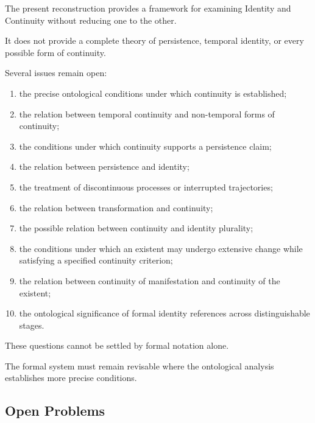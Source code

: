 The present reconstruction
provides a framework
for examining Identity
and Continuity without
reducing one to the
other.

It does not provide
a complete theory
of persistence, temporal
identity, or every
possible form of
continuity.

Several issues remain
open:

\begin{enumerate}
    \item the precise
    ontological conditions
    under which continuity
    is established;

    \item the relation
    between temporal
    continuity and
    non-temporal forms
    of continuity;

    \item the conditions
    under which continuity
    supports a persistence
    claim;

    \item the relation
    between persistence
    and identity;

    \item the treatment
    of discontinuous
    processes or interrupted
    trajectories;

    \item the relation
    between transformation
    and continuity;

    \item the possible
    relation between
    continuity and
    identity plurality;

    \item the conditions
    under which an
    existent may undergo
    extensive change
    while satisfying
    a specified continuity
    criterion;

    \item the relation
    between continuity
    of manifestation
    and continuity
    of the existent;

    \item the ontological
    significance of
    formal identity
    references across
    distinguishable stages.
\end{enumerate}

These questions cannot
be settled by formal
notation alone.

The formal system
must remain revisable
where the ontological
analysis establishes
more precise conditions.

\subsection{Open Problems}

